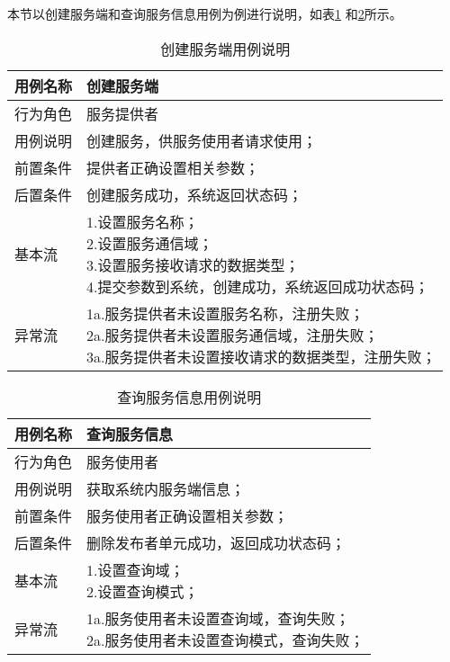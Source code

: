 本节以创建服务端和查询服务信息用例为例进行说明，如表\ref{regist_service_server_yongli}
和\ref{delete_service_server_yongli}所示。
\begin{table}[H]
  \centering\small
  \renewcommand\arraystretch{1.2}
  \caption{创建服务端用例说明}
  \label{regist_service_server_yongli}
  \begin{tabular}{ll}
    \toprule
    \multicolumn{1}{l}{用例名称} & \multicolumn{1}{l}{创建服务端}  \\
    \midrule
    行为角色 & 服务提供者\\
    用例说明 & 创建服务，供服务使用者请求使用；\\
    前置条件 & 提供者正确设置相关参数；\\
    后置条件 & 创建服务成功，系统返回状态码；\\
    基本流   & \makecell[l]{1.设置服务名称；\\2.设置服务通信域；\\3.设置服务接收请求的数据类型；\\4.提交参数到系统，创建成功，系统返回成功状态码；}\\
    异常流   & \makecell[l]{1a.服务提供者未设置服务名称，注册失败；\\2a.服务提供者未设置服务通信域，注册失败；\\3a.服务提供者未设置接收请求的数据类型，注册失败；}\\
    \bottomrule
  \end{tabular}
\end{table}
\begin{table}[H]
  \centering\small
  \renewcommand\arraystretch{1.2}
  \caption{查询服务信息用例说明}
  \label{delete_service_server_yongli}
  \begin{tabular}{ll}
    \toprule
    \multicolumn{1}{l}{用例名称} & \multicolumn{1}{l}{查询服务信息}  \\
    \midrule
    行为角色 & 服务使用者\\
    用例说明 & 获取系统内服务端信息；\\
    前置条件 & 服务使用者正确设置相关参数；\\
    后置条件 & 删除发布者单元成功，返回成功状态码；\\
    基本流   & \makecell[l]{1.设置查询域；\\2.设置查询模式；}\\
    异常流   & \makecell[l]{1a.服务使用者未设置查询域，查询失败；\\2a.服务使用者未设置查询模式，查询失败；}\\
    \bottomrule
  \end{tabular}
\end{table}


